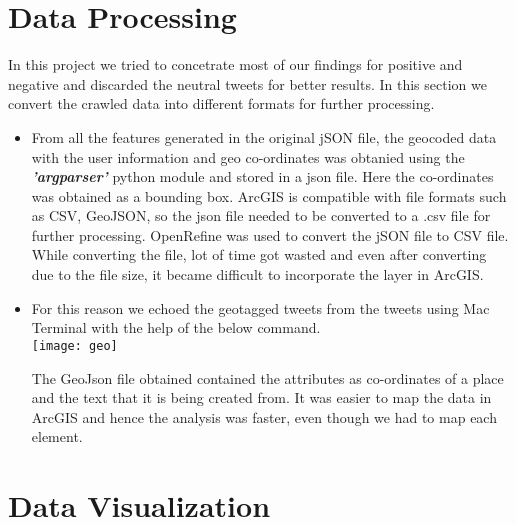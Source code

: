 \documentclass[12pt, oneside]{article}   	%
\begin{document}
\section{Data Processing}
 In this project we tried to concetrate most of our findings for positive and negative and discarded the neutral tweets for better results. In this section we convert the crawled data into different formats for further processing.

\begin{itemize}
	\item From all the features generated in the original jSON file, the geocoded data with the user information and geo co-ordinates was obtanied using the \textbf{\textit{'argparser'}} python module and stored in a json file. Here the co-ordinates was obtained as a bounding box. ArcGIS is compatible with file formats such as  CSV, GeoJSON, so the json file needed to be converted to a .csv file for further processing. OpenRefine was used to convert the jSON file to CSV file. While converting the file, lot of time got wasted and even after converting due to the file size, it became difficult to incorporate the layer in ArcGIS.
	
	\item For this reason we echoed the geotagged tweets from the tweets using Mac Terminal with the help of the below command. \\
	
	\texttt{[image: geo]}
	
	The GeoJson file obtained contained the attributes as co-ordinates of a place and the text that it is being created from. It was easier to map the data in ArcGIS and hence the analysis was faster, even though we had to map each element.
\end{itemize} 

\noindent 

\section{Data Visualization}
\end{document}
